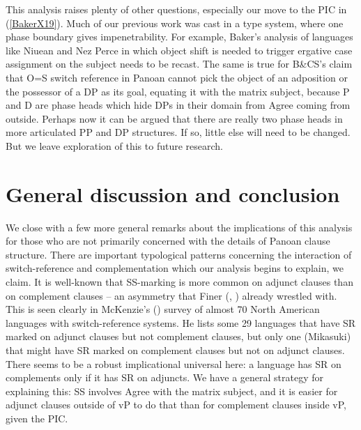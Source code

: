 \documentclass[output=paper]{langscibook}
\begin{document}
This analysis raises plenty of other questions, especially our move to the PIC in (\ref{BakerX19}). Much of our previous work was cast in a \citet{chomsky2000minimalist} type system, where one phase boundary gives impenetrability. For example, Baker’s \citeyearpar{chomsky2000minimalist} analysis of languages like Niuean and Nez Perce in which object shift is needed to trigger ergative case assignment on the subject needs to be recast. The same is true for B\&CS’s claim that O=S switch reference in Panoan cannot pick the object of an adposition or the possessor of a DP as its goal, equating it with the matrix subject, because P and D are phase heads which hide DPs in their domain from Agree coming from outside. Perhaps now it can be argued that there are really two phase heads in more articulated PP and DP structures. If so, little else will need to be changed. But we leave exploration of this to future research.

\section{General discussion and conclusion}\label{sec:baker:6}

We close with a few more general remarks about the implications of this analysis for those who are not primarily concerned with the details of Panoan clause structure. There are important typological patterns concerning the interaction of switch-ref\-er\-ence and complementation which our analysis begins to explain, we claim. It is well-known that SS-marking is more common on adjunct clauses than on complement clauses – an asymmetry that Finer (\citeyear{finer1984formal}, \citeyear{finer1985syntax}) already wrestled with. This is seen clearly in McKenzie’s (\citeyear{mckenzie2015survey}) survey of almost 70 North American languages with switch-ref\-er\-ence systems. He lists some 29 languages that have SR marked on adjunct clauses but not complement clauses, but only one (Mikasuki) that might have SR marked on complement clauses but not on adjunct clauses. There seems to be a robust implicational universal here: a language has SR on complements only if it has SR on adjuncts. We have a general strategy for explaining this: SS involves Agree with the matrix subject, and it is easier for adjunct clauses outside of vP to do that than for complement clauses inside vP, given the PIC.
\end{document}
